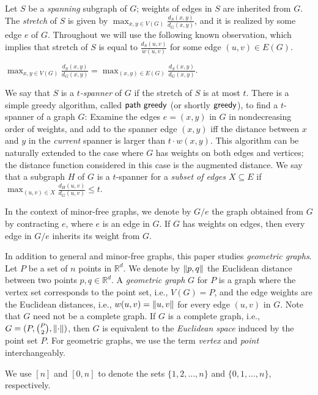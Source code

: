 Let $S$ be a \emph{spanning} subgraph of $G$; weights of edges in $S$ are inherited from $G$. The \emph{stretch} of $S$  is  given by $\max_{x,y \in V(G)} \frac{d_S(x,y)}{d_G(x,y)}$, and it is realized by some edge $e$ of $G$. Throughout we will use the following known observation,
which implies that stretch of $S$ is  equal to $\frac{d_S(u,v)}{w(u,v)}$ for some edge $(u,v) \in E(G)$. 
\begin{observation} \label{stretch:ob}
 $\max_{x,y \in V(G)} \frac{d_S(x,y)}{d_G(x,y)} =  \max_{(x,y) \in E(G)} \frac{d_S(x,y)}{d_G(x,y)}$.
\end{observation}
 We say that $S$ is a \emph{$t$-spanner} of $G$ if the stretch of $S$ is at most $t$. There is a simple greedy algorithm,  called $\mathsf{path~greedy}$ (or shortly $\mathsf{greedy}$), to find a $t$-spanner of a graph $G$: Examine the edges $e = (x,y)$ in  $G$ in nondecreasing order of weights, and add to the spanner edge $(x,y)$ iff the distance between $x$ and $y$ in the {\em current} spanner is larger than $t\cdot w(x,y)$. This algorithm can be naturally extended to the case where $G$ has weights on both edges and vertices; the distance function considered in this case is the augmented distance.  We say that a subgraph $H$ of $G$ is a $t$-spanner for a \emph{subset of edges $X\subseteq E$} if $\max_{(u,v) \in X} \frac{d_H(u,v)}{d_G(u,v)} \leq t$. 



 

In the context of minor-free graphs, we denote by $G/e$ the graph obtained from $G$ by contracting $e$, where $e$ is an edge in $G$. If $G$ has weights on edges, then every edge in $G/e$ inherits its weight from $G$.

In addition to general and minor-free graphs, this paper studies {\em geometric graphs}.  Let $P$ be a set of $n$ points in $\mathbb{R}^d$. We denote by $\nor2{p,q}$ the Euclidean distance between two points $p,q\in \mathbb{R}^d$.   A  \emph{geometric graph} $G$ for $P$ is a graph where the vertex set corresponds to the point set, i.e., $V(G) = P$, and the edge weights are the Euclidean distances, i.e.,  $w(u,v) = \nor2{u,v}$ for every edge $(u,v)$ in $G$. Note that $G$ need not be a complete graph. If $G$ is a complete graph, i.e., $G = (P, {P \choose 2},\nor2{\cdot})$, then $G$ is equivalent to the {\em Euclidean space} induced by the point set $P$.
For geometric graphs, we use the term \emph{vertex} and \emph{point} interchangeably. 


We use $[n]$ and $[0,n]$ to denote the sets $\{1,2,\ldots,n\}$ and $\{0,1,\ldots,n\}$, respectively.


